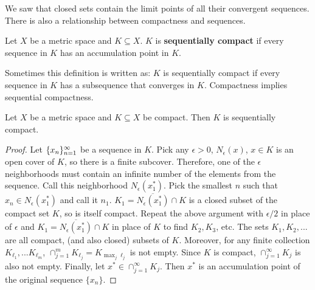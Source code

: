We saw that closed sets contain the limit points of all their
convergent sequences. There is also a relationship between compactness
and sequences. 
\begin{definition}
  Let $X$ be a metric space and $K \subseteq X$. $K$ is
  \textbf{sequentially compact} if every sequence in $K$ has an
  accumulation point in $K$.
\end{definition}
Sometimes this definition is written as: $K$ is sequentially compact
if every sequence in $K$ has a subsequence that converges in
$K$. Compactness implies sequential compactness. 
\begin{lemma}\label{lem:compactSeqCompact}
    Let $X$ be a metric space and $K \subseteq X$ be compact. Then $K$
    is sequentially compact. 
\end{lemma}
\begin{proof}
  Let $\{{x}_n \}_{n=1}^\infty$ be a sequence in
  $K$. Pick any $\epsilon>0$, $N_\epsilon(x)$, $x \in K$ is an open
  cover of $K$, so there is a finite subcover. Therefore, one of the
  $\epsilon$ neighborhoods must contain an infinite number of the
  elements from the sequence. Call this neighborhood
  $N_\epsilon(x_1^\ast)$. Pick the smallest $n$ such that $x_n \in
  N_\epsilon(x_1^\ast)$ and call it $n_1$. $K_1 = \overline{N_{\epsilon}(x_1^\ast)}
  \cap K$ is a closed subset of the compact set $K$, so is itself
  compact. Repeat the above argument with $\epsilon/2$ in place of
  $\epsilon$ and $K_1 = \overline{N_{\epsilon}(x_1^\ast)} \cap K$ in place of $K$
  to find $K_2, K_3$, etc. The sets $K_1, K_2, ...$ are all compact,
  (and also closed) subsets of $K$. Moreover, for any finite collection $K_{\ell_1}
  , ... K_{\ell_m}$, $\cap_{j=1}^m K_{\ell_j} = K_{\max_j{\ell_j}}$ is
  not empty. Since $K$ is compact, $\cap_{j=1}^\infty K_j$ is also not
  empty. Finally, let $x^* \in \cap_{j=1}^\infty K_j$. Then $x^*$ is
  an accumulation point of the original sequence $\{x_n\}$.
\end{proof}

